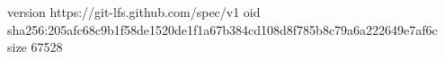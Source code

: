 version https://git-lfs.github.com/spec/v1
oid sha256:205afc68c9b1f58de1520de1f1a67b384cd108d8f785b8c79a6a222649e7af6c
size 67528
